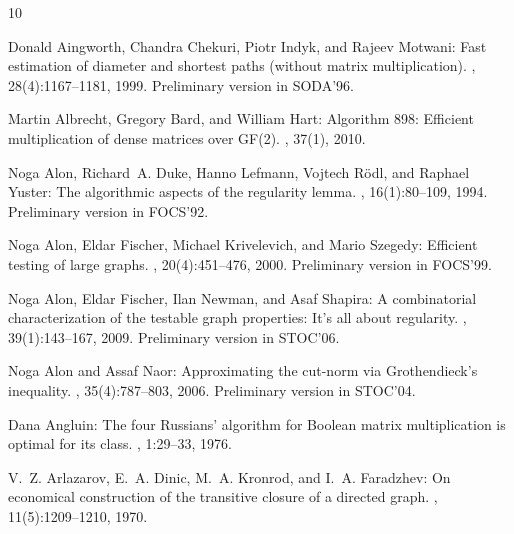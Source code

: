 \tocrefpdfbookmark
\begin{thebibliography}{10}

{\sc Donald Aingworth, Chandra Chekuri, Piotr Indyk, and Rajeev Motwani}: Fast
  estimation of diameter and shortest paths (without matrix multiplication).
, 28(4):1167--1181, 1999.
\newblock Preliminary version in SODA'96.
\newblock [\epfmtdoi{10.1137/S0097539796303421}]

{\sc Martin Albrecht, Gregory Bard, and William Hart}: Algorithm 898:
  {Efficient} multiplication of dense matrices over {GF(2)}.
, 37(1), 2010.
\newblock [\epfmtdoi{10.1145/1644001.1644010}]

{\sc Noga Alon, Richard~A. Duke, Hanno Lefmann, Vojtech R{\"o}dl, and Raphael
  Yuster}: The algorithmic aspects of the regularity lemma.
, 16(1):80--109, 1994.
\newblock Preliminary version in FOCS'92.

{\sc Noga Alon, Eldar Fischer, Michael Krivelevich, and Mario Szegedy}:
  Efficient testing of large graphs.
, 20(4):451--476, 2000.
\newblock Preliminary version in FOCS'99.
\newblock [\epfmtdoi{10.1007/s004930070001}]

{\sc Noga Alon, Eldar Fischer, Ilan Newman, and Asaf Shapira}: A combinatorial
  characterization of the testable graph properties: {It's} all about
  regularity.
, 39(1):143--167, 2009.
\newblock Preliminary version in STOC'06.
\newblock [\epfmtdoi{10.1137/060667177}]

{\sc Noga Alon and Assaf Naor}: Approximating the cut-norm via {G}rothendieck's
  inequality.
, 35(4):787--803, 2006.
\newblock Preliminary version in STOC'04.
\newblock [\epfmtdoi{10.1137/S0097539704441629}]

{\sc Dana Angluin}: The four {R}ussians' algorithm for {B}oolean matrix
  multiplication is optimal for its class.
, 1:29--33, 1976.
\newblock [\epfmtdoi{10.1145/1008591.1008593}]

{\sc V.~Z. Arlazarov, E.~A. Dinic, M.~A. Kronrod, and I.~A. Faradzhev}: On
  economical construction of the transitive closure of a directed graph.
, 11(5):1209--1210, 1970.


\end{thebibliography}
